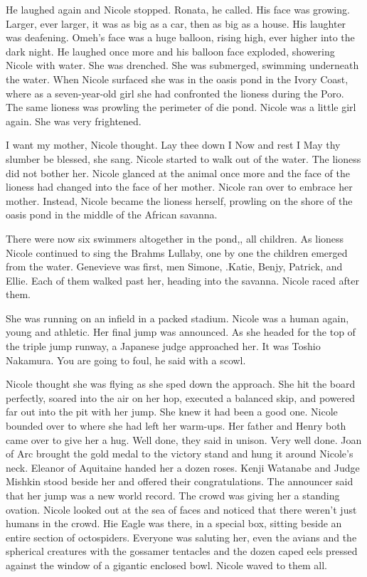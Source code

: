 \documentclass[]{article}
\begin{document}
{{He laughed again and Nicole stopped.  Ronata, he called.  His face was growing.  Larger, ever larger, it was as big as a car, then as big as a house.  His laughter was deafening.  Omeh’s face was a huge balloon, rising high, ever higher into the dark night.  He laughed once more and his balloon face exploded, showering Nicole with water.  She was drenched.  She was submerged, swimming underneath the water.  When Nicole surfaced she was in the oasis pond in the Ivory Coast, where as a seven-year-old girl she had confronted the lioness during the Poro.  The same lioness was prowling the perimeter of die pond.  Nicole was a little girl again.  She was very frightened.

I want my mother, Nicole thought.  Lay thee down I Now and rest I May thy slumber be blessed, she sang.  Nicole started to walk out of the water.  The lioness did not bother her.  Nicole glanced at the animal once more and the face of the lioness had changed into the face of her mother.  Nicole ran over to embrace her mother.  Instead, Nicole became the lioness herself, prowling on the shore of the oasis pond in the middle of the African savanna.

There were now six swimmers altogether in the pond,, all children.  As lioness Nicole continued to sing the Brahms Lullaby, one by one the children emerged from the water.  Genevieve was first, men Simone, .Katie, Benjy, Patrick, and Ellie.  Each of them walked past her, heading into the savanna.  Nicole raced after them.

She was running on an infield in a packed stadium.  Nicole was a human again, young and athletic.  Her final jump was announced.  As she headed for the top of the triple jump runway, a Japanese judge approached her.  It was Toshio Nakamura.  You are going to foul, he said with a scowl.

Nicole thought she was flying as she sped down the approach.  She hit the board perfectly, soared into the air on her hop, executed a balanced skip, and powered far out into the pit with her jump.  She knew it had been a good one.  Nicole bounded over to where she had left her warm-ups.  Her father and Henry both came over to give her a hug.  Well done, they said in unison.  Very well done.  Joan of Arc brought the gold medal to the victory stand and hung it around Nicole’s neck.  Eleanor of Aquitaine handed her a dozen roses.  Kenji Watanabe and Judge Mishkin stood beside her and offered their congratulations.  The announcer said that her jump was a new world record.  The crowd was giving her a standing ovation.  Nicole looked out at the sea of faces and noticed that there weren’t just humans in the crowd.  Hie Eagle was there, in a special box, sitting beside an entire section of octospiders.  Everyone was saluting her, even the avians and the spherical creatures with the gossamer tentacles and the dozen caped eels pressed against the window of a gigantic enclosed bowl.  Nicole waved to them all.

}}
\end{document}
